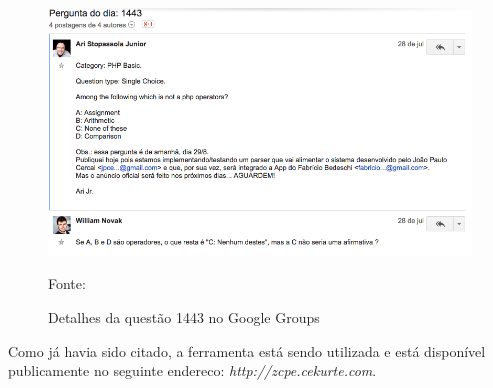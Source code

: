 \begin{figure}[h!tb]
	\caption{Detalhes da questão 1443 no Google Groups}
	\label{fig:zcpePerguntaDetalhesGoogleGroups}

	\centering
	\includegraphics[width=\textwidth]{images/resultados/google-groups-pergunta-1443.png}

	\centering
	\footnotesize Fonte: \fonteOAutor
\end{figure}

\FloatBarrier 	%

Como já havia sido citado, a ferramenta está sendo utilizada e está disponível
publicamente no seguinte endereco: \textit{http://zcpe.cekurte.com}.
